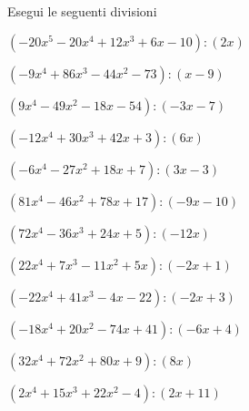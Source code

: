\begin{esercizio}\label{ese:}
Esegui le seguenti divisioni
\begin{enumeratea}
\item  \(\left(-20 x^5 -20 x^4 +12 x^3 +6 x -10 \right) : \left(2 x  \right)\)
\item  \(\left(-9 x^4 +86 x^3 -44 x^2 -73 \right) : \left(x -9 \right)\)
\item  \(\left(9 x^4 -49 x^2 -18 x -54 \right) : \left(-3 x -7 \right)\)
\item  \(\left(-12 x^4 +30 x^3 +42 x +3 \right) : \left(6 x  \right)\)
\item  \(\left(-6 x^4 -27 x^2 +18 x +7 \right) : \left(3 x -3 \right)\)
\item  \(\left(81 x^4 -46 x^2 +78 x +17 \right) : \left(-9 x -10 \right)\)
\item  \(\left(72 x^4 -36 x^3 +24 x +5 \right) : \left(-12 x  \right)\)
\item  \(\left(22 x^4 +7 x^3 -11 x^2 +5 x  \right) : \left(-2 x +1 \right)\)
\item  \(\left(-22 x^4 +41 x^3 -4 x -22 \right) : \left(-2 x +3 \right)\)
\item  \(\left(-18 x^4 +20 x^2 -74 x +41 \right) : \left(-6 x +4 \right)\)
\item  \(\left(32 x^4 +72 x^2 +80 x +9 \right) : \left(8 x  \right)\)
\item  \(\left(2 x^4 +15 x^3 +22 x^2 -4 \right) : \left(2 x +11 \right)\)

\end{enumeratea}
\end{esercizio}
